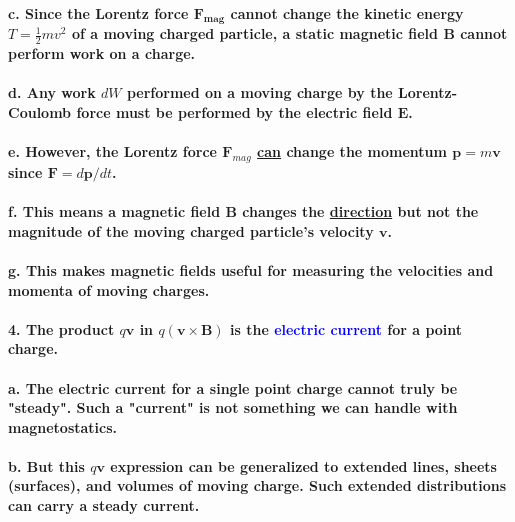 \documentclass{article}
\begin{document}
\paragraph{\indent c. Since the Lorentz force $\boldsymbol{F_{mag}}$ cannot change the kinetic energy $T=\frac{1}{2}mv^2$ of a moving charged particle, a static magnetic field $\boldsymbol{B}$ cannot perform work on a charge.}
\paragraph{\indent d. Any work $dW$ performed on a moving charge by the Lorentz-Coulomb force must be performed by the electric field $\boldsymbol{E}$.}
\paragraph{\indent e. However, the Lorentz force $\boldsymbol{F}_{mag}$ \underline{can} change the momentum $\boldsymbol{p}=m\boldsymbol{v}$ since $\boldsymbol{F}=d\boldsymbol{p}/dt$.}
\paragraph{\indent f. This means a magnetic field $\boldsymbol{B}$ changes the \underline{direction} but not the magnitude of the moving charged particle's velocity $\boldsymbol{v}$.}
\paragraph{\indent g. This makes magnetic fields useful for measuring the velocities and momenta of moving charges.}
\paragraph{4. The product $q\boldsymbol{v}$ in $q(\boldsymbol{v}\times\boldsymbol{B})$ is the \textcolor{blue}{electric current} for a point charge.}
\paragraph{\indent a. The electric current for a single point charge cannot truly be "steady". Such a "current" is not something we can handle with magnetostatics.}
\paragraph{\indent b. But this $q\boldsymbol{v}$ expression can be generalized to extended lines, sheets (surfaces), and volumes of moving charge. Such extended distributions can carry a steady current.}
\end{document}
